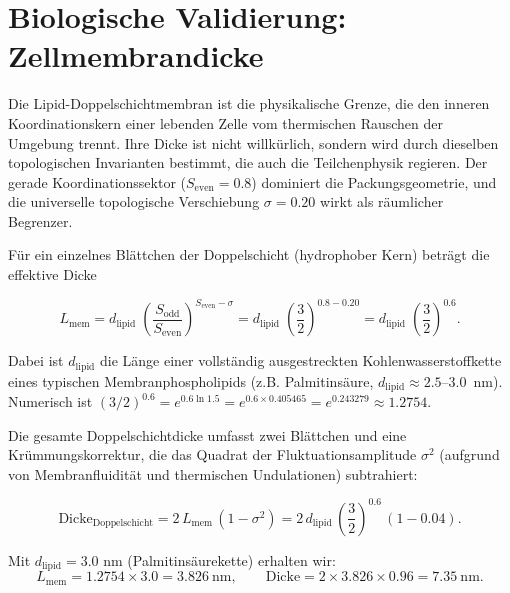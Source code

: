 \documentclass[12pt,a4paper]{article}
\theoremstyle{remark}
\begin{document}
	\section{Biologische Validierung: Zellmembrandicke}
	\label{sec:bio-membrane}
	
	Die Lipid-Doppelschichtmembran ist die physikalische Grenze, die den inneren
	Koordinationskern einer lebenden Zelle vom thermischen Rauschen der Umgebung
	trennt. Ihre Dicke ist nicht willkürlich, sondern wird durch dieselben
	topologischen Invarianten bestimmt, die auch die Teilchenphysik regieren. Der
	gerade Koordinationssektor (\(S_{\mathrm{even}} = 0.8\)) dominiert die
	Packungsgeometrie, und die universelle topologische Verschiebung \(\sigma = 0.20\)
	wirkt als räumlicher Begrenzer.
	
	Für ein einzelnes Blättchen der Doppelschicht (hydrophober Kern) beträgt die
	effektive Dicke
	
	\begin{equation}
		L_{\mathrm{mem}} = d_{\mathrm{lipid}} \;
		\left( \frac{S_{\mathrm{odd}}}{S_{\mathrm{even}}} \right)^{S_{\mathrm{even}} - \sigma}
		= d_{\mathrm{lipid}} \;
		\left( \frac{3}{2} \right)^{0.8 - 0.20}
		= d_{\mathrm{lipid}} \;
		\left( \frac{3}{2} \right)^{0.6}.
	\end{equation}
	
	Dabei ist \(d_{\mathrm{lipid}}\) die Länge einer vollständig ausgestreckten
	Kohlenwasserstoffkette eines typischen Membranphospholipids (z.B. Palmitinsäure,
	\(d_{\mathrm{lipid}} \approx 2.5\)--\(3.0\)~nm). Numerisch ist
	\((3/2)^{0.6} = e^{0.6\ln 1.5} = e^{0.6 \times 0.405465} = e^{0.243279}
	\approx 1.2754\).
	
	Die gesamte Doppelschichtdicke umfasst zwei Blättchen und eine
	Krümmungskorrektur, die das Quadrat der Fluktuationsamplitude \(\sigma^2\)
	(aufgrund von Membranfluidität und thermischen Undulationen) subtrahiert:
	
	\begin{equation}
		\boxed{\text{Dicke}_{\text{Doppelschicht}} = 2 \, L_{\mathrm{mem}} \,
			(1 - \sigma^2) = 2 \, d_{\mathrm{lipid}} \,
			\left( \frac{3}{2} \right)^{0.6} \, (1 - 0.04)}.
	\end{equation}
	
	Mit \(d_{\mathrm{lipid}} = 3.0\) nm (Palmitinsäurekette) erhalten wir:
	\[
	L_{\mathrm{mem}} = 1.2754 \times 3.0 = 3.826\ \text{nm},
	\qquad
	\text{Dicke} = 2 \times 3.826 \times 0.96 = 7.35\ \text{nm}.
	\]
	
\end{document}
